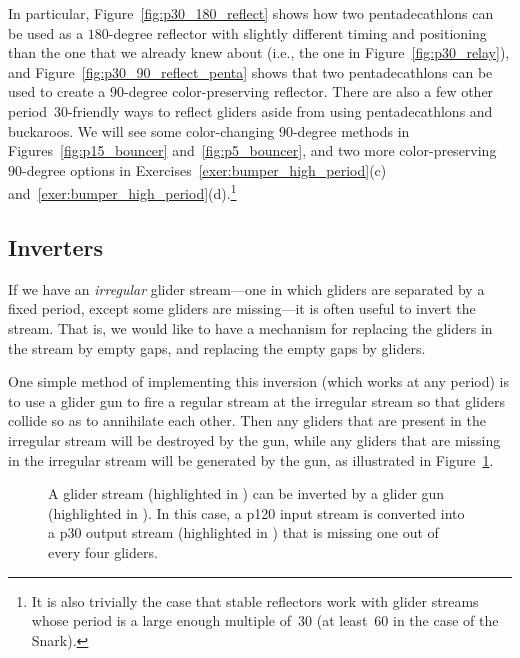 In particular, Figure~\ref{fig:p30_180_reflect} shows how two pentadecathlons can be used as a $180$-degree reflector with slightly different timing and positioning than the one that we already knew about (i.e., the one in Figure~\ref{fig:p30_relay}), and Figure~\ref{fig:p30_90_reflect_penta} shows that two pentadecathlons can be used to create a $90$-degree color-preserving reflector. There are also a few other period~$30$-friendly ways to reflect gliders aside from using pentadecathlons and buckaroos. We will see some color-changing $90$-degree methods in Figures~\ref{fig:p15_bouncer} and~\ref{fig:p5_bouncer}, and two more color-preserving $90$-degree options in Exercises~\ref{exer:bumper_high_period}(c) and~\ref{exer:bumper_high_period}(d).\footnote{It is also trivially the case that stable reflectors work with glider streams whose period is a large enough multiple of~$30$ (at least~$60$ in the case of the Snark).} 


\subsection{Inverters}\label{sec:p30_inline_inverter}

If we have an \emph{irregular} glider stream---one in which gliders are separated by a fixed period, except some gliders are missing---it is often useful to invert the stream. That is, we would like to have a mechanism for replacing the gliders in the stream by empty gaps, and replacing the empty gaps by gliders.

One simple method of implementing this inversion (which works at any period) is to use a glider gun to fire a regular stream at the irregular stream so that gliders collide so as to annihilate each other. Then any gliders that are present in the irregular stream will be destroyed by the gun, while any gliders that are missing in the irregular stream will be generated by the gun, as illustrated in Figure~\ref{fig:inverter_non_inline}.

\begin{figure}[!htb]
	\centering
	\caption{A glider stream (highlighted in ) can be inverted by a glider gun (highlighted in ). In this case, a p120 input stream is converted into a p30 output stream (highlighted in ) that is missing one out of every four gliders.}
	\label{fig:inverter_non_inline}
\end{figure}

